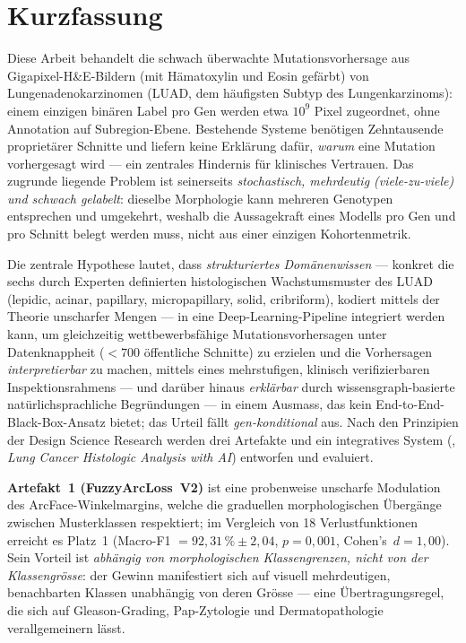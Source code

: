 \chapter*{Kurzfassung}

Diese Arbeit behandelt die schwach überwachte Mutationsvorhersage aus
Gigapixel-H\&E-Bildern (mit Hämatoxylin und Eosin gefärbt) von
Lungenadenokarzinomen (LUAD, dem häufigsten Subtyp des
Lungenkarzinoms): einem einzigen binären Label pro Gen werden etwa
$10^9$ Pixel zugeordnet, ohne Annotation auf Subregion-Ebene.
Bestehende Systeme benötigen Zehntausende proprietärer Schnitte und
liefern keine Erklärung dafür, \emph{warum} eine Mutation
vorhergesagt wird --- ein zentrales Hindernis für klinisches
Vertrauen. Das zugrunde liegende Problem ist seinerseits
\emph{stochastisch, mehrdeutig (viele-zu-viele) und schwach
gelabelt}: dieselbe Morphologie kann mehreren Genotypen entsprechen
und umgekehrt, weshalb die Aussagekraft eines Modells pro Gen und
pro Schnitt belegt werden muss, nicht aus einer einzigen
Kohortenmetrik.

Die zentrale Hypothese lautet, dass \emph{strukturiertes
Domänenwissen} --- konkret die sechs durch Experten definierten
histologischen Wachstumsmuster des LUAD
(lepidic, acinar, papillary, micropapillary, solid, cribriform),
kodiert mittels der Theorie unscharfer Mengen --- in eine
Deep-Learning-Pipeline integriert werden kann, um gleichzeitig
wettbewerbsfähige Mutationsvorhersagen unter Datenknappheit
($<\!700$ öffentliche Schnitte) zu erzielen und die Vorhersagen
\emph{interpretierbar} zu machen, mittels eines mehrstufigen,
klinisch verifizierbaren Inspektionsrahmens --- und darüber hinaus
\emph{erklärbar} durch wissensgraph-basierte
natürlichsprachliche Begründungen --- in einem Ausmass, das kein
End-to-End-Black-Box-Ansatz bietet; das Urteil fällt
\emph{gen-konditional} aus.
Nach den Prinzipien der Design Science Research werden drei
Artefakte und ein integratives System (\lchai{},
\emph{Lung Cancer Histologic Analysis with AI}) entworfen und
evaluiert.

\textbf{Artefakt~1 (FuzzyArcLoss~V2)} ist eine probenweise
unscharfe Modulation des ArcFace-Winkelmargins, welche die
graduellen morphologischen Übergänge zwischen Musterklassen
respektiert; im Vergleich von 18 Verlustfunktionen erreicht es
Platz~1 (Macro-F1 $= 92{,}31\,\%\!\pm\!2{,}04$, $p\!=\!0{,}001$,
Cohen's~$d\!=\!1{,}00$). Sein Vorteil ist
\emph{abhängig von morphologischen Klassengrenzen, nicht von der
Klassengrösse}: der Gewinn manifestiert sich auf visuell
mehrdeutigen, benachbarten Klassen unabhängig von deren Grösse ---
eine Übertragungsregel, die sich auf Gleason-Grading,
Pap-Zytologie und Dermatopathologie verallgemeinern lässt.

